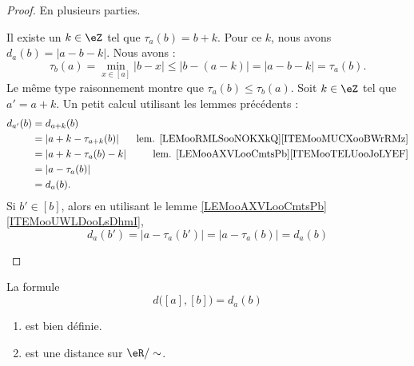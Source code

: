 \begin{proof}
	En plusieurs parties.
	\begin{subproof}
		Il existe un \( k\in \eZ\) tel que \( \tau_a(b)=b+k\). Pour ce \( k\), nous avons \( d_a(b)=| a-b-k |\). Nous avons :
		\begin{equation}
			\tau_b(a)=\min_{x\in [a]}| b-x |\leq | b-(a-k) |=| a-b-k |=\tau_a(b).
		\end{equation}
		Le même type raisonnement montre que \( \tau_a(b)\leq \tau_b(a)\).
		Soit \( k\in \eZ\) tel que \( a'=a+k\). Un petit calcul utilisant les lemmes précédents :
		\begin{subequations}
			\begin{align}
				d_{a'}(b) & =d_{a+k}(b)                                                                          \\
				          & =| a+k-\tau_{a+k}(b) | & \text{lem. \ref{LEMooRMLSooNOKXkQ}\ref{ITEMooMUCXooBWrRMz}} \\
				          & = | a+k-\tau_a(b)-k |  & \text{lem. \ref{LEMooAXVLooCmtsPb}\ref{ITEMooTELUooJoLYEF}} \\
				          & =| a-\tau_a(b) |                                                                     \\
				          & =d_a(b).
			\end{align}
		\end{subequations}
		Si \( b'\in [b]\), alors en utilisant le lemme \ref{LEMooAXVLooCmtsPb}\ref{ITEMooUWLDooLsDhmI},
		\begin{equation}
			d_a(b')=| a-\tau_a(b') |=| a-\tau_a(b) |=d_a(b)
		\end{equation}
	\end{subproof}
\end{proof}

\begin{theorem}	\label{THOooLUOHooCBuOPX}
	La formule
	\begin{equation}
		d\big( [a],[b] \big)=d_a(b)
	\end{equation}
	\begin{enumerate}
		\item
		      est bien définie.
		\item
		      est une distance sur \( \eR/\sim\).
	\end{enumerate}
\end{theorem}

